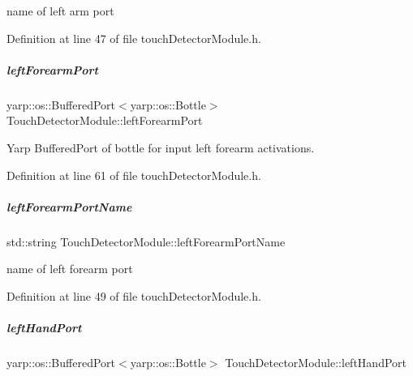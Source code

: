 name of left arm port 



Definition at line 47 of file touch\+Detector\+Module.\+h.

\mbox{\label{group__touchDetector_a2b47dd0c495d1c6fddf8021c9fa1f2f0}} 
\subparagraph{\texorpdfstring{left\+Forearm\+Port}{leftForearmPort}}
{\footnotesize\ttfamily yarp\+::os\+::\+Buffered\+Port$<$yarp\+::os\+::\+Bottle$>$ Touch\+Detector\+Module\+::left\+Forearm\+Port\hspace{0.3cm}{\ttfamily [protected]}}



Yarp Buffered\+Port of bottle for input left forearm activations. 



Definition at line 61 of file touch\+Detector\+Module.\+h.

\mbox{\label{group__touchDetector_a38f40c16f5969f69e305c89699c0d8af}} 
\subparagraph{\texorpdfstring{left\+Forearm\+Port\+Name}{leftForearmPortName}}
{\footnotesize\ttfamily std\+::string Touch\+Detector\+Module\+::left\+Forearm\+Port\+Name\hspace{0.3cm}{\ttfamily [protected]}}



name of left forearm port 



Definition at line 49 of file touch\+Detector\+Module.\+h.

\mbox{\label{group__touchDetector_a5ce89302b0d1691947fc15e4ac7ea46f}} 
\subparagraph{\texorpdfstring{left\+Hand\+Port}{leftHandPort}}
{\footnotesize\ttfamily yarp\+::os\+::\+Buffered\+Port$<$yarp\+::os\+::\+Bottle$>$ Touch\+Detector\+Module\+::left\+Hand\+Port\hspace{0.3cm}{\ttfamily [protected]}}



